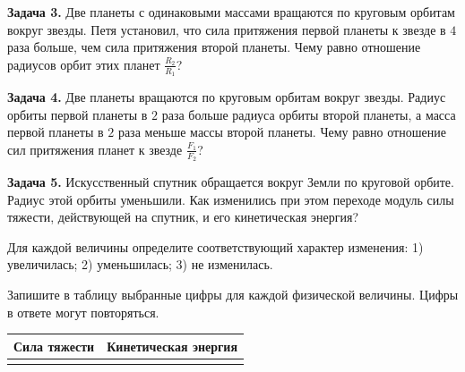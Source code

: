 \begin{taskbasic}[code={\label{task:gravity_v3_n2}}]
\textbf{Задача 3.} Две планеты с одинаковыми массами вращаются по круговым орбитам вокруг звезды. Петя установил, что сила притяжения первой планеты к звезде в $4$ раза больше, чем сила притяжения второй планеты. Чему равно отношение радиусов орбит этих планет $\frac{R_2}{R_1}$?

\end{taskbasic}

\begin{taskbasic}[code={\label{task:gravity_v4_n2}}]
\textbf{Задача 4.} Две планеты вращаются по круговым орбитам вокруг звезды. Радиус орбиты первой планеты в $2$ раза больше радиуса орбиты второй планеты, а масса первой планеты в $2$ раза меньше массы второй планеты. Чему равно отношение сил притяжения планет к звезде $\frac{F_1}{F_2}$?

\end{taskbasic}

\begin{taskbasic}[code={\label{task:gravity_v5_n6}}]
\textbf{Задача 5.} Искусственный спутник обращается вокруг Земли по круговой орбите. Радиус этой орбиты уменьшили. Как изменились при этом переходе модуль силы тяжести, действующей на спутник, и его кинетическая энергия?

Для каждой величины определите соответствующий характер изменения:
1) увеличилась;
2) уменьшилась;
3) не изменилась.

Запишите в таблицу выбранные цифры для каждой физической величины. Цифры в ответе могут повторяться.
\begin{center}
\begin{tabular}{|c|c|}
\hline
Сила тяжести & Кинетическая энергия \\ \hline
 & \\ \hline
\end{tabular}
\end{center}

\end{taskbasic}

